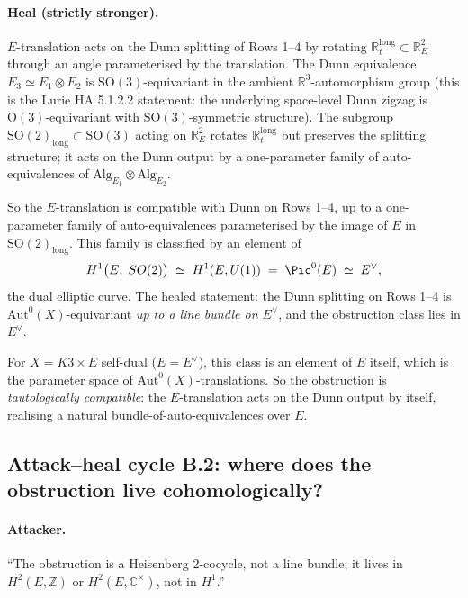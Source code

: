 \documentclass[11pt]{article}
\newcommand{\Eone}{E_{1}}
\newcommand{\Etwo}{E_{2}}
\newcommand{\Ethree}{E_{3}}
\newcommand{\Alg}{\mathrm{Alg}}
\newcommand{\R}{\mathbb{R}}
\newcommand{\C}{\mathbb{C}}
\newcommand{\Z}{\mathbb{Z}}
\newcommand{\Aut}{\mathrm{Aut}}
\begin{document}
\paragraph{Heal (strictly stronger).}
$E$-translation acts on the Dunn splitting of Rows 1--4 by rotating
$\R_t^{\mathrm{long}} \subset \R^2_E$ through an angle parameterised by
the translation. The Dunn equivalence $\Ethree \simeq \Eone \otimes
\Etwo$ is $\mathrm{SO}(3)$-equivariant in the ambient
$\R^3$-automorphism group (this is the Lurie HA 5.1.2.2 statement: the
underlying space-level Dunn zigzag is $\mathrm{O}(3)$-equivariant with
$\mathrm{SO}(3)$-symmetric structure). The subgroup
$\mathrm{SO}(2)_{\mathrm{long}} \subset \mathrm{SO}(3)$ acting on
$\R^2_E$ rotates $\R_t^{\mathrm{long}}$ but preserves the splitting
structure; it acts on the Dunn output by a one-parameter family of
auto-equivalences of $\Alg_{\Eone} \otimes \Alg_{\Etwo}$.

So the $E$-translation is compatible with Dunn on Rows 1--4, up to a
one-parameter family of auto-equivalences parameterised by the image
of $E$ in $\mathrm{SO}(2)_{\mathrm{long}}$. This family is classified
by an element of
\[
  H^1\bigl(E,\; \mathrm{SO}(2)\bigr) \;\simeq\; H^1(E, U(1)) \;=\; \Pic^0(E) \;\simeq\; E^\vee,
\]
the dual elliptic curve. The healed statement: the Dunn splitting on
Rows 1--4 is $\Aut^0(X)$-equivariant \emph{up to a line bundle on
$E^\vee$}, and the obstruction class lies in $E^\vee$.

For $X = K3 \times E$ self-dual ($E = E^\vee$), this class is an
element of $E$ itself, which is the parameter space of
$\Aut^0(X)$-translations. So the obstruction is \emph{tautologically
compatible}: the $E$-translation acts on the Dunn output by itself,
realising a natural bundle-of-auto-equivalences over $E$.

\subsection{Attack--heal cycle B.2: where does the obstruction live
  cohomologically?}

\paragraph{Attacker.}
``The obstruction is a Heisenberg 2-cocycle, not a line bundle; it lives
in $H^2(E, \Z)$ or $H^2(E, \C^\times)$, not in $H^1$.''
\end{document}
